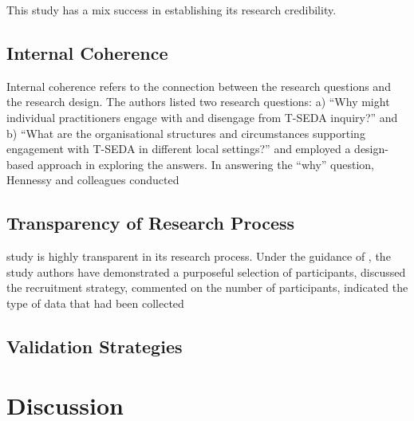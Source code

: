\documentclass[
        a4paper, %
        12pt, %
        stu, %
        donotrepeattitle, %
        floatsintext, %
        biblatex, %
        twoside, %
        colorlinks=true,        %
        linkcolor=red,          %
        anchorcolor=red,      %
        citecolor=blue,         %
        urlcolor=blue,          %
        bookmarks=true,         %
        bookmarksopen=false,    %
        bookmarksnumbered=true,  %
        dvipsnames
]{apa7}
\begin{document}
This study has a mix success in establishing its research credibility.

\subsection{Internal Coherence} %

Internal coherence refers to the connection between the research questions and the research design. The authors listed two research questions: a) ``Why might individual practitioners engage with and disengage from T-SEDA inquiry?'' and b) ``What are the organisational structures and circumstances supporting engagement with T-SEDA in different local settings?'' and employed a design-based approach in exploring the answers. In answering the ``why'' question, Hennessy and colleagues conducted

\subsection{Transparency of Research Process} %

 study is highly transparent in its research process. Under the guidance of \textcite[][pp. 185--187]{creswell:2018}, the study authors have demonstrated a purposeful selection of participants, discussed the recruitment strategy, commented on the number of participants, indicated the type of data that had been collected

\subsection{Validation Strategies} %

\section{Discussion} %

\printbibliography
\end{document}
